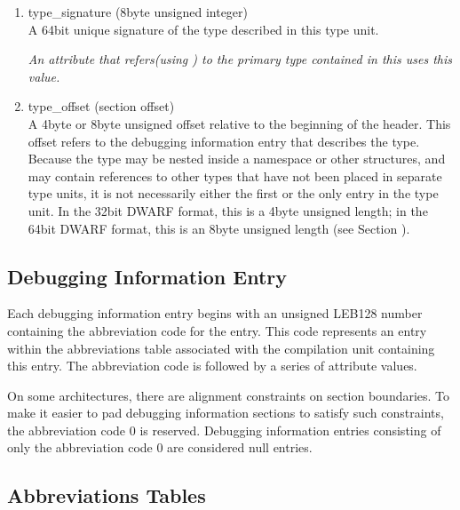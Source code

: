 \begin{enumerate}[1.]
\item type\_signature (8\dash byte unsigned integer) \\
A 
64\dash bit unique signature of the type described in this type
unit.  

\textit{An attribute that refers(using ) to
the primary type contained in 
this  uses this value.}


\item type\_offset (section offset) \\
A 4\dash byte or 8\dash byte unsigned offset 
relative to the beginning
of the  header.
This offset refers to the debugging
information entry that describes the type. Because the type
may be nested inside a namespace or other structures, and may
contain references to other types that have not been placed in
separate type units, it is not necessarily either the first or
the only entry in the type unit. In the 32\dash bit DWARF format,
this is a 4\dash byte unsigned length; in the 64\dash bit DWARF format,
this is an 8\dash byte unsigned length
(see Section ).

\end{enumerate}

\subsection{Debugging Information Entry}
\label{datarep:debugginginformationentry}

Each debugging information entry begins with an unsigned LEB128
number containing the abbreviation code for the entry. This
code represents an entry within the abbreviations table
associated with the compilation unit containing this entry. The
abbreviation code is followed by a series of attribute values.

On some architectures, there are alignment constraints on
section boundaries. To make it easier to pad debugging
information sections to satisfy such constraints, the
abbreviation code 0 is reserved. Debugging information entries
consisting of only the abbreviation code 0 are considered
null entries.

\subsection{Abbreviations Tables}
\label{datarep:abbreviationstables}


